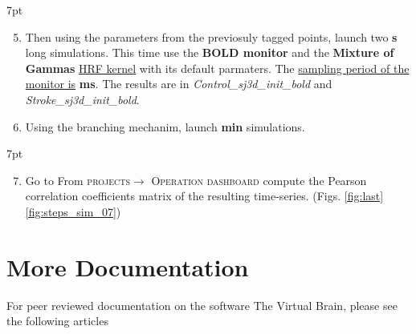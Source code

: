 \documentclass{tufte-handout}
\newenvironment{formal}{%
  \def\FrameCommand{%
    \hspace{1pt}%
    {\color{DarkBlue}\vrule width 2pt}%
    {\color{formalshade}\vrule width 4pt}%
    \colorbox{formalshade}%
  }%
  \MakeFramed{\advance\hsize-\width\FrameRestore}%
  \noindent\hspace{-4.55pt}%
  \begin{adjustwidth}{}{7pt}%
  \vspace{2pt}\vspace{2pt}%
}
{%
  \vspace{2pt}\end{adjustwidth}\endMakeFramed%
}
\newenvironment{simulation}{%
  \def\FrameCommand{%
    \hspace{1pt}%
    {\color{ForestGreen}\vrule width 2pt}%
    {\color{simulationshade}\vrule width 4pt}%
    \colorbox{simulationshade}%
  }%
  \MakeFramed{\advance\hsize-\width\FrameRestore}%
  \noindent\hspace{-4.55pt}%
  \begin{adjustwidth}{}{7pt}%
  \vspace{2pt}\vspace{2pt}%
}
{%
  \vspace{2pt}\end{adjustwidth}\endMakeFramed%
}
\begin{document}
   \begin{simulation}
\begin{enumerate}[resume]
\setcounter{enumi}{4}
  \item Then using the parameters from the previosuly tagged points, launch two \textbf{\unit[60]{s}} long simulations. This time use the \textbf{BOLD monitor} and the \textbf{Mixture of Gammas} \underline{HRF kernel} with its default parmaters. The \underline{sampling period of the monitor is} \textbf{\unit[2000]{ms}}. The results are in \textit{Control\_sj3d\_init\_bold} and \textit{Stroke\_sj3d\_init\_bold}.
  \item Using the branching mechanim, launch \textbf{\unit[4]{min}} simulations. 
  \end{enumerate}
\end{simulation}


\begin{formal}
\begin{enumerate}[resume]
\setcounter{enumi}{6}
\item Go to From \textsc{projects}$\rightarrow$ \textsc{Operation dashboard} compute the Pearson correlation coefficients matrix of the resulting time-series. (Figs. \ref{fig:last} \ref{fig:steps_sim_07}) 
  \end{enumerate}
\end{formal}

\section{More Documentation}\label{sec:more-doc}
For peer reviewed documentation on the software The Virtual Brain, please see the following articles \citep{Sanz-Leon_2013,  Woodman_2014}
\end{document}

